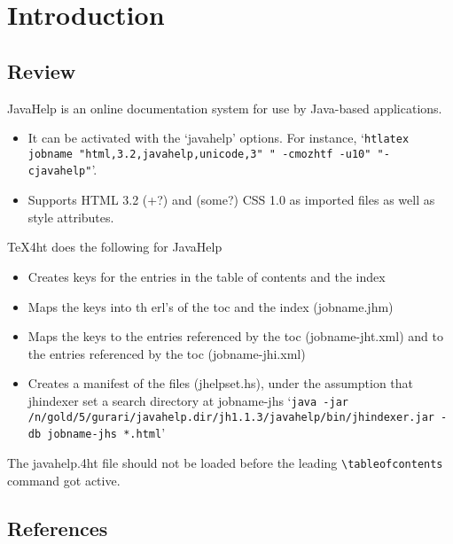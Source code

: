 \section{Introduction}

\subsection{Review}

JavaHelp is an online documentation system for use by Java-based
applications. 


\begin{itemize}
\item
It can be activated with the
`javahelp' options. For instance, 
`\verb+htlatex jobname "html,3.2,javahelp,unicode,3" " -cmozhtf -u10" "-cjavahelp"+'. 
\item  Supports HTML 3.2 (+?) and (some?) CSS 1.0 as imported 
files as well as style attributes.
\end{itemize}


TeX4ht does the following for JavaHelp

\begin{itemize}
\item Creates keys for the entries in the table of contents
and the index
\item Maps the keys into th erl's of the toc and the index (jobname.jhm)
\item Maps the keys to the entries referenced by the toc (jobname-jht.xml)
and to the entries referenced by the toc (jobname-jhi.xml)
\item Creates a manifest of the files (jhelpset.hs), under the assumption
that jhindexer set a search directory at jobname-jhs
`{\tt java -jar /n/gold/5/gurari/javahelp.dir/jh1.1.3/javahelp/bin/jhindexer.jar -db jobname-jhs *.html}'
\end{itemize}



The javahelp.4ht file should not be loaded before the leading
\verb+\tableofcontents+ command got active.



\subsection{References}

